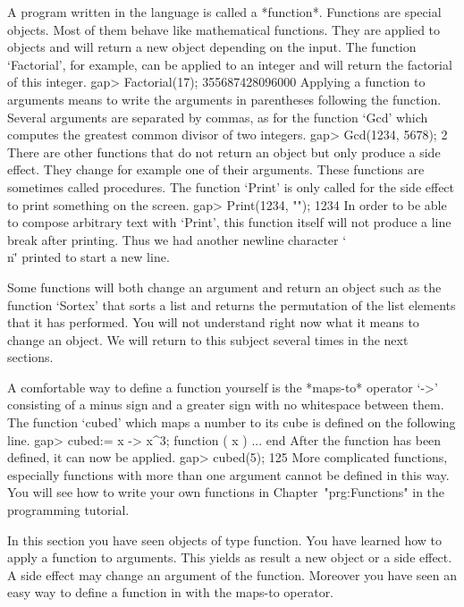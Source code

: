 A  program  written  in  the  {\GAP} language  is  called  a  *function*.
Functions  are   special  {\GAP}  objects.   Most  of  them  behave  like
mathematical functions.  They are applied to  objects and  will return  a
new  object  depending  on  the input.   The  function  `Factorial',  for
example,  can be applied to an  integer and will  return the factorial of
this integer.
\beginexample
    gap> Factorial(17);
    355687428096000 
\endexample
Applying  a  function  to arguments  means  to  write  the  arguments  in
parentheses following the function.   Several arguments are  separated by
commas, as for the  function  `Gcd' which  computes  the greatest  common
divisor of two integers.
\beginexample
    gap> Gcd(1234, 5678);
    2 
\endexample
There are other functions that do not return an object but only produce a
side effect.   They change for  example  one of their  arguments.   These
functions are sometimes called  procedures.  The function `Print' is only
called for the side effect to print something on the screen.
\beginexample
    gap> Print(1234, "\n");
    1234 
\endexample
In order to be able to compose arbitrary text with `Print', this function
itself will not produce a line break  after printing. Thus we had another
newline character `\"\\n\"' printed to start a new line.

Some functions will both change an argument  and return an object such as
the function `Sortex'  that sorts a  list and returns the permutation  of
the list  elements that it has  performed.  You will not understand right
now what it means  to change an object.   We will return to this  subject
several times in the next sections.

%
A comfortable way to define a function yourself is the *maps-to* operator
`->' consisting of  a minus sign and a   greater sign with  no whitespace
between them. The function  `cubed' which maps a  number  to its  cube is
defined on the following line.
\beginexample
    gap> cubed:= x -> x^3;
    function ( x ) ... end 
\endexample
After the function has been defined, it can now be applied.
\beginexample
    gap> cubed(5);
    125 
\endexample
More complicated  functions,  especially  functions with   more  than one
argument cannot be defined in this way.
You will see how to write your own {\GAP} functions in
Chapter~"prg:Functions" in the programming tutorial.

In  this section you have seen {\GAP} objects of type function.  You have
learned how to apply a function to  arguments.  This  yields as result  a
new object or a side effect.  A side effect may change an argument of the
function.   Moreover you have seen an easy  way  to define a  function in
{\GAP} with the maps-to operator.

